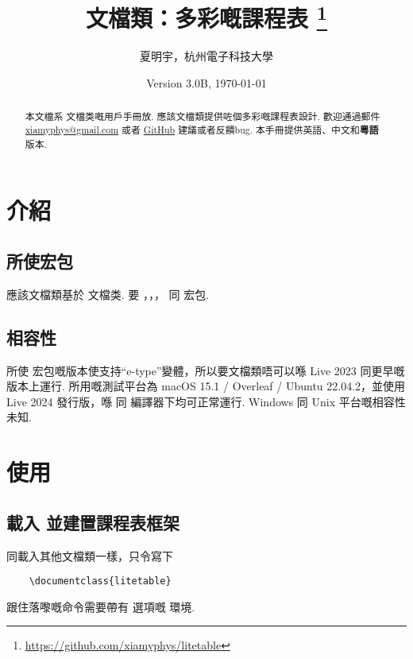 \documentclass[letterpaper]{l3doc}
\title{
    \cls{litetable} 文檔類：多彩嘅課程表
    \thanks{\url{https://github.com/xiamyphys/litetable}}
}
\author{夏明宇，杭州電子科技大學}
\affil{\href{mailto:xiamyphys@gmail.com}{xiamyphys@gmail.com}}
\date{Version 3.0B, \today}
\begin{document}
\maketitle

\begin{abstract}
    本文檔系  文檔类嘅用戶手冊放. 應該文檔類提供咗個多彩嘅課程表設計. 歡迎通過郵件 \href{mailto:xiamyphys@gmail.com}{xiamyphys@gmail.com} 或者 \href{https://github.com/xiamyphys/litetable/issues}{GitHub} 建議或者反饋bug. 本手冊提供英語、中文和\textbf{粵語}版本.
\end{abstract}

\section{介紹}

\subsection{所使宏包}

應該文檔類基於  文檔类. 要 ，，， 同  宏包. 

\subsection{相容性}

所使  宏包嘅版本使支持``e-type''變體，所以要文檔類唔可以喺 Live 2023 同更早嘅版本上運行. 所用嘅測試平台為 macOS 15.1 / Overleaf / Ubuntu 22.04.2，並使用 Live 2024 發行版，喺  同  編譯器下均可正常運行. Windows 同 Unix 平台嘅相容性未知.

\section{使用}

\subsection{載入  並建置課程表框架}

同載入其他文檔類一樣，只令寫下

\begin{Verbatim}
    \documentclass{litetable}
\end{Verbatim}

跟住落嚟嘅命令需要帶有  選項嘅  環境.
\end{document}

